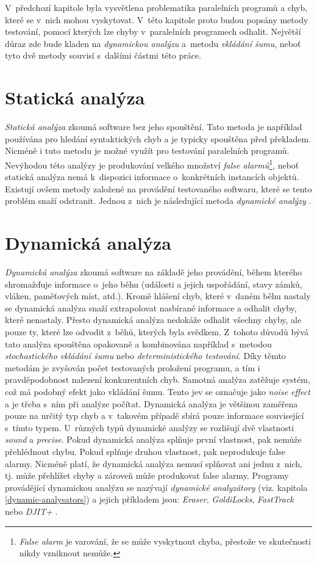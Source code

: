 V~předchozí kapitole byla vysvětlena problematika paralelních programů a chyb, které se v~nich mohou vyskytovat. V~této kapitole proto budou popsány metody testování, pomocí kterých lze chyby v~paralelních programech odhalit. Největší důraz zde bude kladen na \textit{dynamickou analýzu} a~metodu \textit{vkládání šumu}, neboť tyto dvě metody souvisí s~dalšími částmi této práce.

\section{Statická analýza}

\textit{Statická analýza} zkoumá software bez jeho spouštění. Tato metoda je například používána pro hledání syntaktických chyb a je typicky spouštěna před překladem. Nicméně i tuto metodu je možné využít pro testování paralelních programů. Nevýhodou této analýzy je produkování velkého množství \textit{false alarmů}\footnote{\textit{False alarm} je varování, že se může vyskytnout chyba, přestože ve skutečnosti nikdy vzniknout nemůže.}, neboť statická analýza nemá k~dispozici informace o~konkrétních instancích objektů. Existují ovšem metody založené na provádění testovaného softwaru, které se tento problém snaží odstranit. Jednou z~nich je následující metoda \textit{dynamické analýzy} \cite{cite:advances}.

\section{Dynamická analýza}\label{dynamic-analysis}

\textit{Dynamická analýza} zkoumá software na základě jeho provádění, během kterého shromažďuje informace o~jeho běhu (události a jejich uspořádání, stavy zámků, vláken, paměťových míst, atd.). Kromě hlášení chyb, které v~daném běhu nastaly se dynamická analýza snaží extrapolovat nasbírané informace a odhalit chyby, které nenastaly. Přesto dynamická analýza nedokáže odhalit všechny chyby, ale pouze ty, které lze odvodit z~běhů, kterých byla svědkem. Z~tohoto důvodů bývá tato analýza spouštěna opakovaně a kombinována například s~metodou \textit{stochastického vkládání šumu} nebo \textit{deterministického testování}. Díky těmto metodám je zvyšován počet testovaných proložení programu, a tím i pravděpodobnost nalezení konkurentních chyb. Samotná analýza zatěžuje systém, což má podobný efekt jako vkládání šumu. Tento jev se označuje jako \textit{noise effect} a je třeba s~ním při analýze počítat. Dynamická analýza je většinou zaměřena pouze na určitý typ chyb a v~takovém případě sbírá pouze informace související s~tímto typem. U~různých typů dynamické analýzy se rozlišují dvě vlastnosti \textit{sound} a \textit{precise}. Pokud dynamická analýza splňuje první vlastnost, pak nemůže přehlédnout chybu. Pokud splňuje druhou vlastnost, pak neprodukuje false alarmy. Nicméně platí, že dynamická analýza nemusí splňovat ani jednu z~nich, tj. může přehlížet chyby a zároveň může produkovat false alarmy. Programy provádějící dynamickou analýzu se nazývají \textit{dynamické analyzátory} (viz. kapitola \ref{dynamic-analysators}) a jejich příkladem jsou: \textit{Eraser}, \textit{GoldiLocks}, \textit{FastTrack} nebo \textit{DJIT+} \cite{cite:advances,cite:eraser,cite:ft,cite:rr}.

